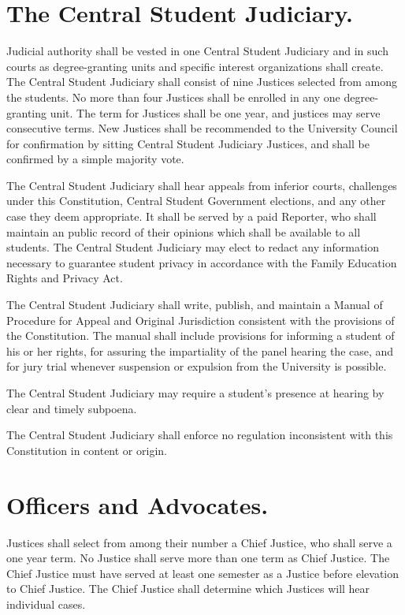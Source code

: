 \section{The Central Student Judiciary.}
    Judicial authority shall be vested in one Central Student Judiciary and in such courts as degree-granting units and specific interest organizations shall create. The Central Student Judiciary shall consist of nine Justices selected from among the students. No more than four Justices shall be enrolled in any one degree-granting unit. The term for Justices shall be one year, and justices may serve consecutive terms. New Justices shall be recommended to the University Council for confirmation by sitting Central Student Judiciary Justices, and shall be confirmed by a simple majority vote.

    The Central Student Judiciary shall hear appeals from inferior courts, challenges under this Constitution, Central Student Government elections, and any other case they deem appropriate. It shall be served by a paid Reporter, who shall maintain an public record of their opinions which shall be available to all students. The Central Student Judiciary may elect to redact any information necessary to guarantee student privacy in accordance with the Family Education Rights and Privacy Act.

   The Central Student Judiciary shall write, publish, and maintain a Manual of Procedure for Appeal and Original Jurisdiction consistent with the provisions of the Constitution. The manual shall include provisions for informing a student of his or her rights, for assuring the impartiality of the panel hearing the case, and for jury trial whenever suspension or expulsion from the University is possible.

    The Central Student Judiciary may require a student's presence at hearing by clear and timely subpoena.

    The Central Student Judiciary shall enforce no regulation inconsistent with this Constitution in content or origin.

\section{Officers and Advocates.}
    Justices shall select from among their number a Chief Justice, who shall serve a one year term. No Justice shall serve more than one term as Chief Justice. The Chief Justice must have served at least one semester as a Justice before elevation to Chief Justice. The Chief Justice shall determine which Justices will hear individual cases.

